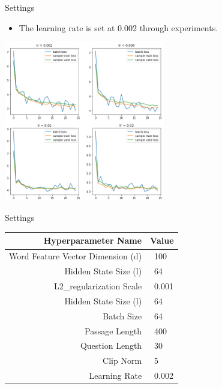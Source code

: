 \documentclass{beamer}
\begin{document}
\begin{frame}{Settings}
    \begin{itemize}
        \item The learning rate is set at 0.002 through experiments.
    \end{itemize}
    \begin{center}
        \includegraphics[width=7cm, height=7cm]{figures/lr.png}
    \end{center}
\end{frame}

\begin{frame}{Settings}
    \begin{table}[htbp]\centering

      \begin{tabular}{|r|l|} \hline
        Hyperparameter Name& Value \\ \hline\hline
        Word Feature Vector Dimension (d) & \ 100 \\
        Hidden State Size (l) & \ 64 \\
        L2\_regularization Scale & \ 0.001\\
        Hidden State Size (l) & \ 64\\
        Batch Size & \ 64\\
        Passage Length & \ 400\\
        Question Length & \ 30\\
        Clip Norm & \ 5\\
        Learning Rate & \ 0.002 \\ \hline
      \end{tabular}
    \end{table}
\end{frame}
\end{document}
